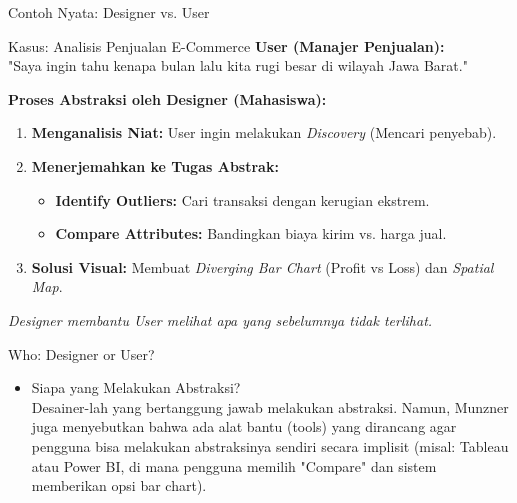 \documentclass[t]{beamer}
\begin{document}
\begin{frame}{Contoh Nyata: Designer vs. User}
    \begin{exampleblock}{Kasus: Analisis Penjualan E-Commerce}
        \textbf{User (Manajer Penjualan):} \\
        "Saya ingin tahu kenapa bulan lalu kita rugi besar di wilayah Jawa Barat."
    \end{exampleblock}

    \vspace{0.3cm}
    \textbf{Proses Abstraksi oleh Designer (Mahasiswa):}
    \begin{enumerate}
        \item \textbf{Menganalisis Niat:} User ingin melakukan \textit{Discovery} (Mencari penyebab).
        \item \textbf{Menerjemahkan ke Tugas Abstrak:}
            \begin{itemize}
                \item \textbf{Identify Outliers:} Cari transaksi dengan kerugian ekstrem.
                \item \textbf{Compare Attributes:} Bandingkan biaya kirim vs. harga jual.
            \end{itemize}
        \item \textbf{Solusi Visual:} Membuat \textit{Diverging Bar Chart} (Profit vs Loss) dan \textit{Spatial Map}.
    \end{enumerate}
    
    \vspace{0.3cm}
    \textit{Designer membantu User melihat apa yang sebelumnya tidak terlihat.}
\end{frame}


\begin{frame}{Who: Designer or User?}
\begin{itemize}
	\item Siapa yang Melakukan Abstraksi? \\
	Desainer-lah yang bertanggung jawab melakukan abstraksi. Namun, Munzner juga menyebutkan bahwa ada alat bantu (tools) yang dirancang agar pengguna bisa melakukan abstraksinya sendiri secara implisit (misal: Tableau atau Power BI, di mana pengguna memilih "Compare" dan sistem memberikan opsi bar chart).
\end{itemize}
\end{frame}
\end{document}
